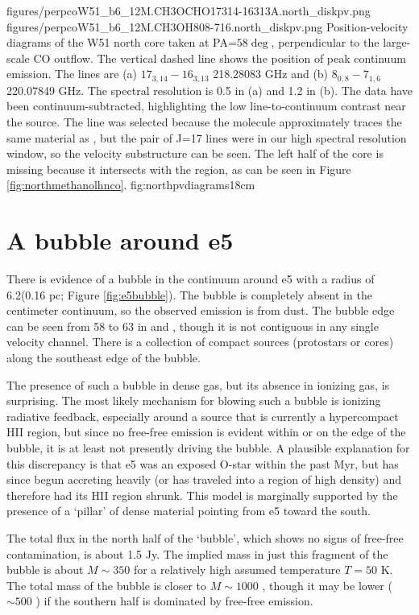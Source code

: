 \documentclass{emulateapj}
\begin{document}
\FigureTwo
{figures/perpcoW51_b6_12M.CH3OCHO17314-16313A.north_diskpv.png}
{figures/perpcoW51_b6_12M.CH3OH808-716.north_diskpv.png}
{Position-velocity diagrams of the W51 north core taken at PA=$58\deg$,
perpendicular to the large-scale CO outflow.  The vertical dashed line shows the
position of peak continuum emission. The lines are (a) \methylformate
$17_{3,14}-16_{3,13}$ 218.28083 GHz and (b) \methanol $8_{0,8}-7_{1,6}$
220.07849 GHz.  The spectral resolution is 0.5 \kms in (a) and 1.2 \kms in (b).
The data have been continuum-subtracted, highlighting the low line-to-continuum
contrast near the source.  The \methylformate line was selected because the
molecule approximately traces the same material as \methanol, but the pair of
\methylformate J=17 lines were in our high spectral resolution window, so the
velocity substructure can be seen.
The left half of the core is missing because it intersects with the \hii
region, as can be seen in Figure \ref{fig:northmethanolhnco}.
}
{fig:northpvdiagrams}{1}{8cm}

\section{A bubble around e5}
\label{sec:e5bubble}
There is evidence of a bubble in the continuum around e5 with a radius of
6.2\arcsec (0.16 pc; Figure \ref{fig:e5bubble}).  The bubble is completely
absent in the centimeter continuum, so the observed emission is from dust.  The
bubble edge can be seen from 58 \kms to 63 \kms in \ceighteeno and
\formaldehyde, though it is not contiguous in any single velocity channel.
There is a collection of compact sources (protostars or cores) along the
southeast edge of the bubble.

The presence of such a bubble in dense gas, but its absence in ionizing gas, is
surprising.  The most likely mechanism for blowing such a bubble is ionizing
radiative feedback, especially around a source that is currently a hypercompact
HII region, but since no free-free emission is evident within or on the edge of
the bubble, it is at least not presently driving the bubble.  A plausible
explanation for this discrepancy is that e5 was an exposed O-star within the
past Myr, but has since begun accreting heavily (or has traveled into a region
of high density) and therefore had its HII
region shrunk.  This model is marginally supported by the presence of a `pillar'
of dense material pointing from e5 toward the south.

The total flux in the north half of the `bubble', which shows no signs of
free-free contamination, is about 1.5 Jy.  The implied mass in just this
fragment of the bubble is about $M\sim350$ \msun for a relatively high assumed
temperature $T=50$ K.  The total mass of the bubble is closer to $M\sim1000$
\msun, though it may be lower ($\sim500$ \msun) if the southern half is
dominated by free-free emission.
\end{document}

